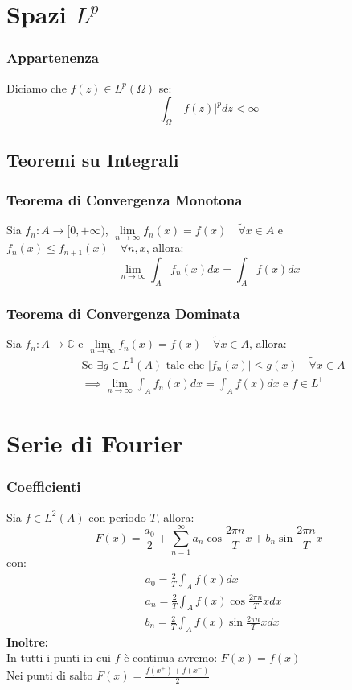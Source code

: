 \documentclass[a4paper,notitlepage]{report}%
\newcommand{\C}{\mathbb{C}}
\begin{document}
\begin{multicols*}{2}
\section*{Spazi $L^p$}
\subsubsection*{Appartenenza}
Diciamo che $f(z)\in L^p(\Omega)$ se:
\[
    \int_\Omega |f(z)|^p dz < \infty   
\]

\subsection*{Teoremi su Integrali}
\subsubsection*{Teorema di Convergenza Monotona}
Sia $f_n:A\to[0,+\infty)$, $\lim\limits_{n\rightarrow\infty} f_n(x)=f(x)\quad \tilde{\forall}x\in A$
e $f_n(x)\leq f_{n+1}(x) \quad \forall n,x$, allora:
\[
    \lim\limits_{n\rightarrow\infty}\int_A f_n(x)dx = \int_A f(x) dx
\]
\subsubsection*{Teorema di Convergenza Dominata}
Sia $f_n:A\to\C$ e $\lim\limits_{n\rightarrow\infty} f_n(x)=f(x)\quad \tilde{\forall}x\in A$, allora:
\begin{align*}
    &\text{Se }\exists g \in L^1(A) \text{ tale che } |f_n(x)|\leq g(x) \quad \tilde{\forall}x\in A\\
    &\implies \lim\limits_{n\rightarrow\infty}\int_A f_n(x)dx = \int_A f(x) dx \text{ e } f\in L^1
\end{align*}

\section*{Serie di Fourier}
\subsubsection{Coefficienti}
Sia $f\in L^2(A)$ con periodo $T$, allora:
\[
    F(x)  = \frac{a_0}{2} + \sum_{n=1}^\infty a_n \cos{\frac{2\pi n}{T}x} + b_n \sin{\frac{2\pi n}{T}x}
\]
con:
\begin{align*}
    &a_0 = \frac{2}{T} \int_A f(x) dx \\
    &a_n = \frac{2}{T} \int_A f(x) \cos{\frac{2\pi n}{T}x} dx \\
    &b_n = \frac{2}{T} \int_A f(x) \sin{\frac{2\pi n}{T}x} dx
\end{align*}
\textbf{Inoltre:}\\
In tutti i punti in cui $f$ è continua avremo: $F(x)=f(x)$\\
Nei punti di salto $F(x) = \frac{f(x^+)+f(x^-)}{2}$


\end{multicols*}
\end{document}
